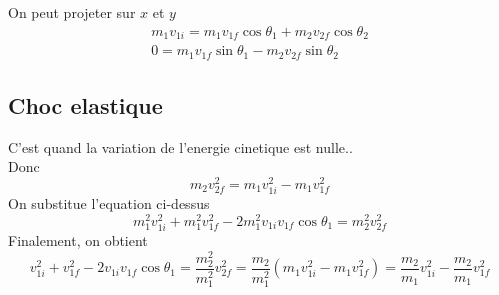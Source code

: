 \documentclass[../main.tex]{subfiles}
\begin{document}
On peut projeter sur $x$ et $y$ 
\begin{align*}
m_1  v_{1i} = m_1 v_{1f}  \cos \theta_1 + m_2 v_{2f}  \cos \theta_2\\
0 = m_1 v_{1f} \sin \theta_1 - m_2 v_{2f} \sin \theta_2
\end{align*}
\subsection{Choc elastique}
C'est quand la variation de l'energie cinetique est nulle..\\
Donc
\[ 
m_2 v_{2f}^{2} = m_1 v_{1i} ^{2} - m_1 v_{1f} ^{2}
\]
On substitue l'equation ci-dessus
\[ 
m_1 ^{2} v_{1i} ^{2} + m_1^{2} v_{1f} ^{2} - 2 m_1^{2}	v_{1i} v_{1f}  \cos \theta_1 = m_2^{2} v_{2f} ^{2}
\]
Finalement, on obtient
\[ 
	v_{1i} ^{2} + v_{1f} ^{2} - 2 v_{1i} v_{1f}  \cos \theta_1 = \frac{m_2^{2}}{m_1^{2}}v_{2f} ^{2} = \frac{m_2}{m_1^{2}}( m_1 v_{1i} ^{2} - m_1 v_{1f} ^{2})  = \frac{m_2}{m_1}v_{1i} ^{2} - \frac{m_2}{m_1}v_{1f} ^{2}
\]



 
\end{document}
